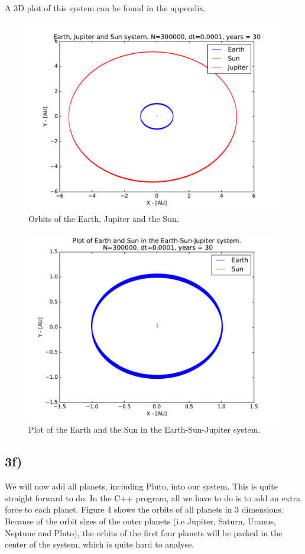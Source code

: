 \documentclass[12pt]{article}
\begin{document}
A 3D plot of this system can be found in the appendix.

\begin{figure}[hbtp]
\centering
\includegraphics[width=\linewidth]{Plots/Earth_Sun_Jupiter.pdf}
\caption{Orbits of the Earth, Jupiter and the Sun.}
\end{figure}

\begin{figure}[hbtp]
\centering
\includegraphics[width=\linewidth]{Plots/ESJ_EarthandSun.pdf}
\caption{Plot of the Earth and the Sun in the Earth-Sun-Jupiter system.}
\end{figure}

\newpage

\subsection*{3f)}
We will now add all planets, including Pluto, into our system. This is quite straight forward to do. In the C++ program, all we have to do is to add an extra force to each planet. Figure 4 shows the orbits of all planets in 3 dimensions. Because of the orbit sizes of the outer planets (i.e Jupiter, Saturn, Uranus, Neptune and Pluto), the orbits of the first four planets will be packed in the center of the system, which is quite hard to analyse. 
\end{document}
